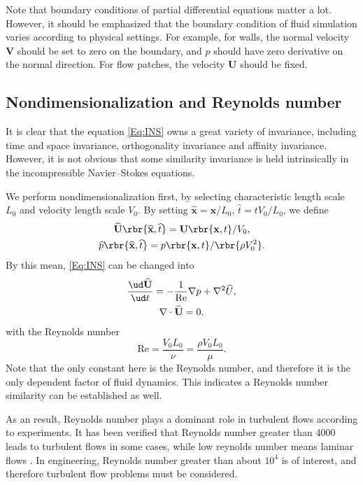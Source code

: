 \documentclass[english, nochinese]{pkupaper}
\begin{document}
Note that boundary conditions of partial differential equations matter a lot. However, it should be emphasized that the boundary condition of fluid simulation varies according to physical settings. For example, for walls, the normal velocity $\mathbf{V}$ should be set to zero on the boundary, and $p$ should have zero derivative on the normal direction. For flow patches, the velocity $\mathbf{U}$ should be fixed.

\subsection{Nondimensionalization and Reynolds number}

It is clear that the equation \eqref{Eq:INS} owns a great variety of invariance, including time and space invariance, orthogonality invariance and affinity invariance. However, it is not obvious that some similarity invariance is held intrinsically in the incompressible Navier--Stokes equations.

We perform nondimensionalization first, by selecting characteristic length scale $L_0$ and velocity length scale $V_0$. By setting $ \widehat{\mathbf{x}} = \mathbf{x} / L_0 $, $ \widehat{t} = t V_0 / L_0 $, we define
\begin{gather}
\widehat{\mathbf{U}} \rbr{ \widehat{\mathbf{x}}, \widehat{t} } = \mathbf{U} \rbr{ \mathbf{x}, t } / V_0, \\
\widehat{p} \rbr{ \widehat{\mathbf{x}}, \widehat{t} } = p \rbr{ \mathbf{x}, t } / \rbr{ \rho V_0^2 }.
\end{gather}
By this mean, \eqref{Eq:INS} can be changed into
\begin{equation} \label{Eq:NDINS}
\begin{gathered}
\frac{ \ud \widehat{\mathbf{U}} }{ \ud t } = -\frac{1}{\mathrm{Re}} \nabla p + \nabla^2 \widehat{U}, \\
\nabla \cdot \widehat{\mathbf{U}} = 0.
\end{gathered}
\end{equation}
with the Reynolds number
\begin{equation}
\mathrm{Re} = \frac{ V_0 L_0 }{\nu} = \frac{ \rho V_0 L_0 }{\mu}.
\end{equation}
Note that the only constant here is the Reynolds number, and therefore it is the only dependent factor of fluid dynamics. This indicates a Reynolds number similarity can be established as well.

As an result, Reynolds number plays a dominant role in turbulent flows according to experiments. It has been verified that Reynolds number greater than 4000 leads to turbulent flows in some cases, while low reynolds number means laminar flows \parencite{holman_heat_1986}. In engineering, Reynolds number greater than about $10^4$ is of interest, and therefore turbulent flow problems must be considered.
\end{document}
